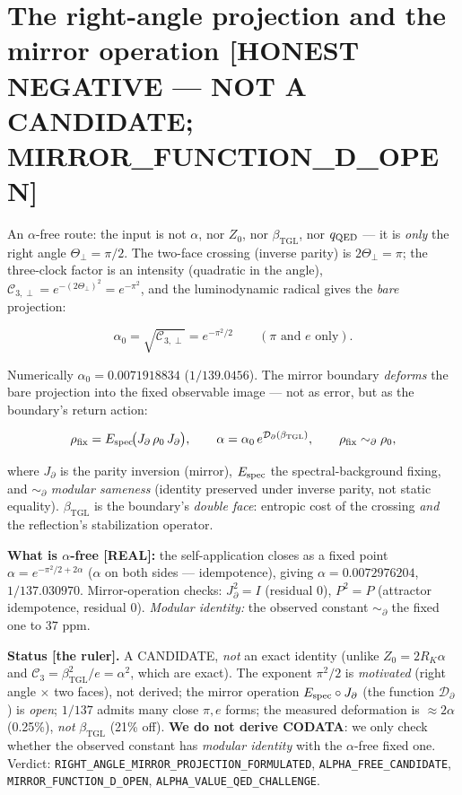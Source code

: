 \documentclass[11pt]{article}
\newcommand{\bTGL}{\beta_{\mathrm{TGL}}}\newcommand{\Msun}{M_{\odot}}\newcommand{\TGL}{\mathrm{TGL}}
\theoremstyle{definition}\newtheorem{deriv}{Derivation}
\begin{document}
\section{The right-angle projection and the mirror operation \textsf{[HONEST NEGATIVE --- NOT A CANDIDATE; MIRROR\_FUNCTION\_D\_OPEN]}}

An $\alpha$-free route: the input is not $\alpha$, nor $Z_0$, nor $\bTGL$, nor $q_{\rm QED}$ --- it is \emph{only} the right angle $\Theta_\perp=\pi/2$. The two-face crossing (inverse parity) is $2\Theta_\perp=\pi$; the three-clock factor is an intensity (quadratic in the angle), $\mathcal C_{3,\perp}=e^{-(2\Theta_\perp)^2}=e^{-\pi^2}$, and the luminodynamic radical gives the \emph{bare} projection:

\begin{equation} \alpha_0=\sqrt{\mathcal C_{3,\perp}}=e^{-\pi^2/2}\qquad(\pi\text{ and }e\text{ only}).\end{equation}

Numerically $\alpha_0=0.0071918834$ ($1/139.0456$). The mirror boundary \emph{deforms} the bare projection into the fixed observable image --- not as error, but as the boundary's return action:

\begin{equation} \rho_{\rm fix}=E_{\rm spec}\!\big(J_\partial\,\rho_0\,J_\partial\big),\qquad \alpha=\alpha_0\,e^{\mathcal D_\partial(\bTGL)},\qquad \rho_{\rm fix}\sim_\partial\rho_0,\end{equation}

where $J_\partial$ is the parity inversion (mirror), $E_{\rm spec}$ the spectral-background fixing, and $\sim_\partial$ \emph{modular sameness} (identity preserved under inverse parity, not static equality). $\bTGL$ is the boundary's \emph{double face}: entropic cost of the crossing \emph{and} the reflection's stabilization operator.

\textbf{What is $\alpha$-free \textsf{[REAL]}:} the self-application closes as a fixed point $\alpha=e^{-\pi^2/2+2\alpha}$ ($\alpha$ on both sides --- idempotence), giving $\alpha=0.0072976204$, $1/137.030970$. Mirror-operation checks: $J_\partial^2=I$ (residual $0$), $P^2=P$ (attractor idempotence, residual $0$). \emph{Modular identity:} the observed constant $\sim_\partial$ the fixed one to $37$ ppm.

\textbf{Status \textsf{[the ruler]}.} A CANDIDATE, \emph{not} an exact identity (unlike $Z_0=2R_K\alpha$ and $\mathcal C_3=\bTGL^2/e=\alpha^2$, which are exact). The exponent $\pi^2/2$ is \emph{motivated} (right angle $\times$ two faces), not derived; the mirror operation $E_{\rm spec}\circ J_\partial$ (the function $\mathcal D_\partial$) is \emph{open}; $1/137$ admits many close $\pi,e$ forms; the measured deformation is $\approx 2\alpha$ (0.25\%), \emph{not} $\bTGL$ (21\% off). \textbf{We do not derive CODATA}: we only check whether the observed constant has \emph{modular identity} with the $\alpha$-free fixed one. Verdict: \texttt{RIGHT\_ANGLE\_MIRROR\_PROJECTION\_FORMULATED}, \texttt{ALPHA\_FREE\_CANDIDATE}, \texttt{MIRROR\_FUNCTION\_D\_OPEN}, \texttt{ALPHA\_VALUE\_QED\_CHALLENGE}.
\end{document}
